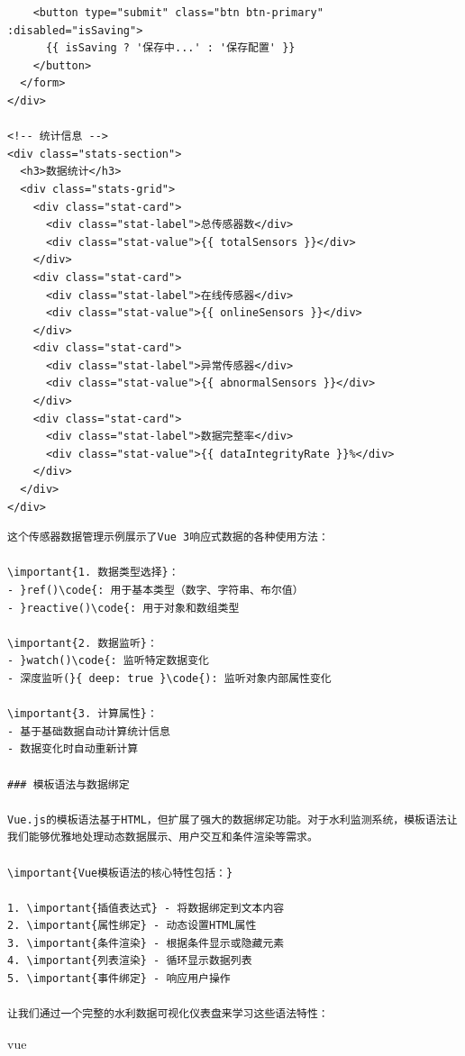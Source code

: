 \begin{verbatim}
    <button type="submit" class="btn btn-primary" :disabled="isSaving">
      {{ isSaving ? '保存中...' : '保存配置' }}
    </button>
  </form>
</div>

<!-- 统计信息 -->
<div class="stats-section">
  <h3>数据统计</h3>
  <div class="stats-grid">
    <div class="stat-card">
      <div class="stat-label">总传感器数</div>
      <div class="stat-value">{{ totalSensors }}</div>
    </div>
    <div class="stat-card">
      <div class="stat-label">在线传感器</div>
      <div class="stat-value">{{ onlineSensors }}</div>
    </div>
    <div class="stat-card">
      <div class="stat-label">异常传感器</div>
      <div class="stat-value">{{ abnormalSensors }}</div>
    </div>
    <div class="stat-card">
      <div class="stat-label">数据完整率</div>
      <div class="stat-value">{{ dataIntegrityRate }}%</div>
    </div>
  </div>
</div>
\end{verbatim}

\begin{lstlisting}
这个传感器数据管理示例展示了Vue 3响应式数据的各种使用方法：

\important{1. 数据类型选择}：
- }ref()\code{: 用于基本类型（数字、字符串、布尔值）
- }reactive()\code{: 用于对象和数组类型

\important{2. 数据监听}：
- }watch()\code{: 监听特定数据变化
- 深度监听(}{ deep: true }\code{): 监听对象内部属性变化

\important{3. 计算属性}：
- 基于基础数据自动计算统计信息
- 数据变化时自动重新计算

### 模板语法与数据绑定

Vue.js的模板语法基于HTML，但扩展了强大的数据绑定功能。对于水利监测系统，模板语法让我们能够优雅地处理动态数据展示、用户交互和条件渲染等需求。

\important{Vue模板语法的核心特性包括：}

1. \important{插值表达式} - 将数据绑定到文本内容
2. \important{属性绑定} - 动态设置HTML属性
3. \important{条件渲染} - 根据条件显示或隐藏元素
4. \important{列表渲染} - 循环显示数据列表
5. \important{事件绑定} - 响应用户操作

让我们通过一个完整的水利数据可视化仪表盘来学习这些语法特性：

\end{lstlisting}

vue

